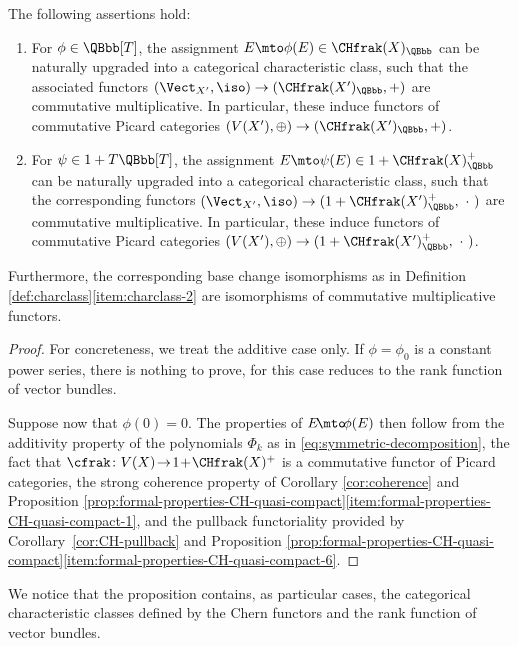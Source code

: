 \begin{proposition}\label{prop:additcharclass}
The following assertions hold:
\begin{enumerate}\label{enum:characteristic-classes}
\item\label{enum:characteristic-classes-1} For $\phi\in\QBbb[T]$, the assignment $E\mto \phi(E)\in\CHfrak(X)_{\QBbb}$ can be naturally upgraded into a categorical characteristic class, such that the associated functors \hbox{$(\Vect_{X^{\prime}},\iso) \to (\CHfrak(X^{\prime})_{\QBbb}, +)$} are commutative multiplicative. In particular, these induce functors of commutative Picard categories $(V(X^{\prime}),\oplus) \to (\CHfrak(X^{\prime})_{\QBbb}, +)$.
\item\label{enum:characteristic-classes-2} For $\psi\in 1+T\QBbb[T]$, the assignment $E \mto \psi(E) \in 1+\CHfrak(X)_{\QBbb}^{+}$ can be naturally upgraded into a categorical characteristic class, such that the corresponding functors $(\Vect_{X^{\prime}},\iso)\to (1+\CHfrak(X^{\prime})_{\QBbb}^{+},\ \cdot\ )$ are commutative multiplicative. In particular, these induce functors of commutative Picard categories $(V(X^{\prime}),\oplus) \to (1+\CHfrak(X^{\prime})_{\QBbb}^{+}, \ \cdot\ )$.
\end{enumerate}
Furthermore, the corresponding base change isomorphisms as in Definition \ref{def:charclass}\eqref{item:charclass-2} are isomorphisms of commutative multiplicative functors.
\end{proposition}
\begin{proof}
For concreteness, we treat the additive case only. If $\phi=\phi_{0}$ is a constant power series, there is nothing to prove, for this case reduces to the rank function of vector bundles.

Suppose now that $\phi(0)\!=\!0$. The properties of $E\!\mto\! \phi(E)$ then follow from the addi\-tivity property of the polynomials $\Phi_{k}$ as in \eqref{eq:symmetric-decomposition}, the fact that \hbox{$\cfrak\colon V(X)\!\to\! 1\!+\!\CHfrak(X)^{+}$} is a commutative functor of Picard categories, the strong coherence property of Corollary \ref{cor:coherence} and Proposition \ref{prop:formal-properties-CH-quasi-compact}\eqref{item:formal-properties-CH-quasi-compact-1}, and the pullback functoriality provided by Corollary~\ref{cor:CH-pullback} and Proposition \ref{prop:formal-properties-CH-quasi-compact}\eqref{item:formal-properties-CH-quasi-compact-6}.
\end{proof}

We notice that the proposition contains, as particular cases, the categorical characteristic classes defined by the Chern functors and the rank function of vector bundles.

